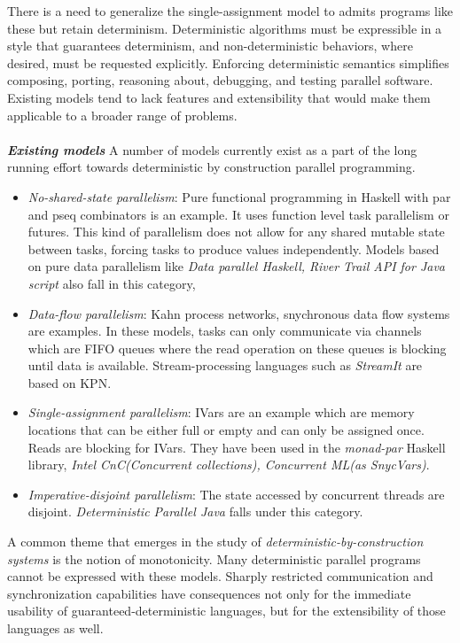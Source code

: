 \documentclass[twocolumn]{article}
\begin{document}
There is a need to generalize the single-assignment model to admits programs like these but retain determinism. Deterministic algorithms must be expressible in a style that guarantees determinism, and non-deterministic behaviors, where desired, must be requested explicitly. Enforcing deterministic semantics simplifies composing, porting, reasoning about, debugging, and testing parallel software. Existing models tend to lack features and extensibility that would make them applicable to a broader range of problems.\\ \\
\textit{\textbf{Existing models}}\cite{kuper} A number of models currently exist as a part of the long running effort towards deterministic by construction parallel programming. \par
\begin{itemize}
        \item \textit{No-shared-state parallelism}: Pure functional programming in Haskell with par and pseq combinators is an example. It uses function level task parallelism or futures. This kind of parallelism does not allow for any shared mutable state between tasks, forcing tasks to produce values independently. Models based on pure data parallelism like \textit{Data parallel Haskell, River Trail API for Java script} also fall in this category,
        \item \textit{Data-flow parallelism}: Kahn process networks, snychronous data flow systems are examples. In these models, tasks can only communicate via channels which are FIFO queues where the read operation on these queues is blocking until data is available. Stream-processing languages such as \textit{StreamIt} are based on KPN. 
        \item \textit{Single-assignment parallelism}: IVars are an example which are memory locations that can be either full or empty and can only be assigned once. Reads are blocking for IVars. They have been used in the \textit{monad-par} Haskell library, \textit{Intel CnC(Concurrent collections), Concurrent ML(as SnycVars)}.
        \item \textit{Imperative-disjoint parallelism}: The state accessed by concurrent threads are disjoint. \textit{Deterministic Parallel Java} falls under this category.     
\end{itemize} 
A common theme that emerges in the study of \textit{deterministic-by-construction systems} is the notion of monotonicity. Many deterministic parallel programs cannot be expressed with these models. Sharply restricted communication and synchronization capabilities have consequences not only for the immediate usability of guaranteed-deterministic languages, but for the extensibility of those languages as well.
\end{document}
